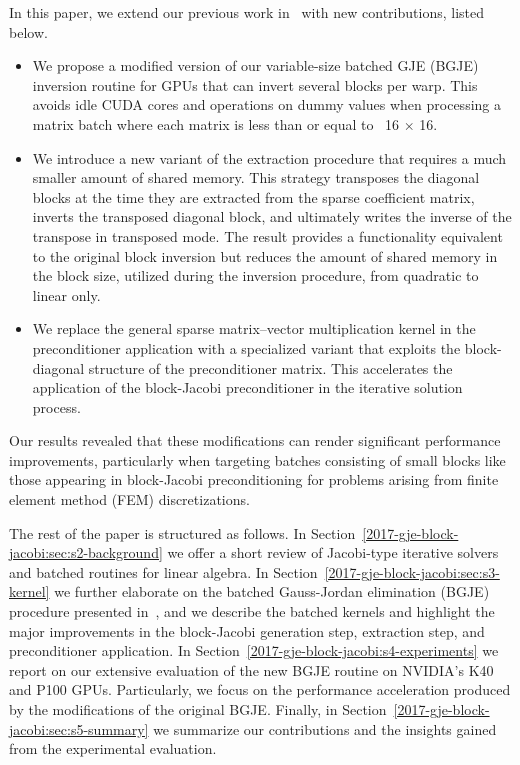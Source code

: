 In this paper, we extend our previous work in~\cite{Anzt:2017:BGE:3026937.3026940} with new contributions, listed below.
\begin{itemize}
\item We propose a modified version of our variable-size batched GJE (BGJE) inversion routine for GPUs that 
      {can invert} 
      several blocks per warp. This avoids idle CUDA cores and
        operations on dummy values when processing a matrix batch where each
        matrix is less than or equal to ~16 $\times$ 16.
\item We introduce a new variant of the extraction procedure that 
requires a much smaller amount of shared memory.
      This strategy transposes the diagonal blocks at the time they are extracted from
        the sparse {coefficient} matrix,
      inverts the transposed diagonal block, and ultimately writes the inverse of the transpose in transposed {mode}.
      The result provides a functionality equivalent to the original block inversion 
      but reduces the amount
      of shared memory in the block size, utilized during the inversion procedure, from quadratic to linear only.
\item We replace the general sparse matrix--vector multiplication kernel in the preconditioner application with a 
      specialized variant that exploits the block-diagonal structure of the preconditioner matrix. 
      This accelerates the application of the block-Jacobi preconditioner in the iterative solution process.
\end{itemize}
{Our} results revealed that these modifications can render
significant performance improvements, particularly when targeting batches
consisting of small blocks like those appearing in block-Jacobi preconditioning
for problems arising from finite element method (FEM) discretizations.

The rest of the paper is structured as follows. In
Section~\ref{2017-gje-block-jacobi:sec:s2-background} we offer a short review of Jacobi-type iterative
solvers and batched routines for linear algebra. In Section~\ref{2017-gje-block-jacobi:sec:s3-kernel}
we further elaborate on the batched Gauss-Jordan elimination (BGJE) procedure presented
in~\cite{Anzt:2017:BGE:3026937.3026940}, and we describe the batched kernels and
highlight the major improvements in the block-Jacobi generation step, extraction
step, and preconditioner application. In Section~\ref{2017-gje-block-jacobi:s4-experiments} we report on
our extensive evaluation of the new BGJE routine on NVIDIA's K40 and P100 GPUs.
Particularly, we focus on the performance acceleration {produced by} the
modifications of the original BGJE. Finally, in Section~\ref{2017-gje-block-jacobi:sec:s5-summary} we
summarize our contributions and the insights gained from the experimental
evaluation.
